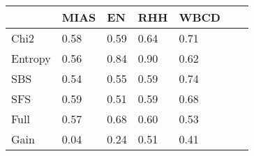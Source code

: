 \begin{tabular}{|l|l|l|l|l|l|l|}
\toprule
{} & MIAS &   EN &  RHH & WBCD \\
\midrule
Chi2    & 0.58 & 0.59 & 0.64 & 0.71 \\
Entropy & 0.56 & 0.84 & 0.90 & 0.62 \\
SBS     & 0.54 & 0.55 & 0.59 & 0.74 \\
SFS     & 0.59 & 0.51 & 0.59 & 0.68 \\
Full    & 0.57 & 0.68 & 0.60 & 0.53 \\
Gain    & 0.04 & 0.24 & 0.51 & 0.41 \\
\bottomrule
\end{tabular}
